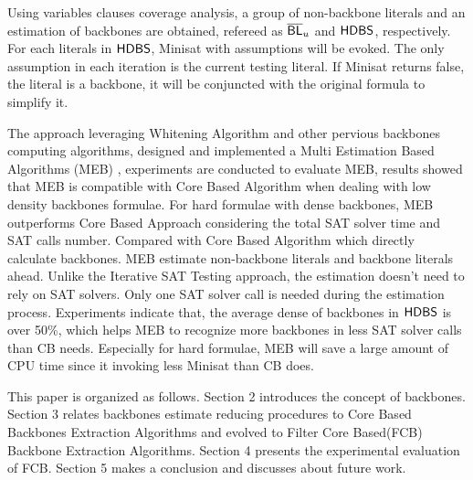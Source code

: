 Using variables clauses coverage analysis, a group of non-backbone literals and an estimation of backbones are obtained, refereed as $\overline{\textsf{BL}}_u$ and $\textsf{HDBS}$, respectively. For each literals in $\textsf{HDBS}$, Minisat with assumptions will be evoked. The only assumption in each iteration is the current testing literal. If Minisat returns false, the literal is a backbone, it will be conjuncted with the original formula to simplify it.

The approach leveraging Whitening Algorithm and other pervious backbones computing algorithms, designed and implemented a Multi Estimation Based Algorithms (MEB) , experiments are conducted to evaluate MEB, results showed that MEB is compatible with Core Based Algorithm when dealing with low density backbones formulae. For hard formulae with dense backbones, MEB outperforms Core Based Approach considering the total SAT solver time and SAT calls number.
Compared with Core Based Algorithm which directly calculate backbones. MEB estimate non-backbone literals and backbone literals ahead.
Unlike the Iterative SAT Testing approach, the estimation doesn't need to rely on SAT solvers. Only one SAT solver call is needed during the estimation process.
Experiments indicate that, the average dense of backbones in $\textsf{HDBS}$ is over 50\%, which helps MEB to recognize more backbones in less SAT solver calls than CB needs. Especially for hard formulae, MEB will save a large amount of CPU time since it invoking less Minisat than CB does.

This paper is organized as follows.
Section 2 introduces the concept of backbones.
Section 3 relates backbones estimate reducing procedures to Core Based Backbones Extraction Algorithms and evolved to Filter Core Based(FCB) Backbone Extraction Algorithms.
Section 4 presents the experimental evaluation of FCB.
Section 5 makes a conclusion and discusses about future work.
